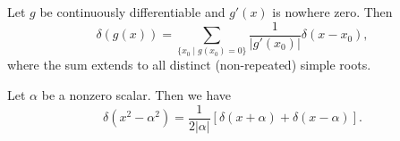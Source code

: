 \begin{theorem}\label{thm:math:delta-function-of-polynomials}
Let $g$ be continuously differentiable and $g'(x)$ is nowhere zero.
Then
\begin{equation}
\delta(g(x)) = \sum_{\{x_{0}\mid g(x_{0})=0\}}\frac{1}{|g'(x_{0})|}\delta(x-x_{0}),
\end{equation}
where the sum extends to all distinct (non-repeated) simple roots.
\end{theorem}

\begin{corollary}\label{cor:math:dirac-delta-function-of-quadratic-polynomial}
  Let $\alpha$ be a nonzero scalar. Then we have
  \begin{equation}
\delta(x^{2} - \alpha^{2}) = \frac{1}{2|\alpha|}\left[\delta(x+\alpha)+\delta(x-\alpha)\right].
  \end{equation}
\end{corollary}
